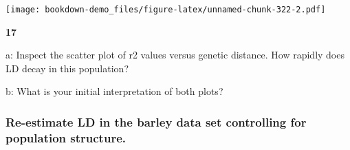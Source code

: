 \documentclass[
]{book}
\makeatletter
\newenvironment{kframe}{%
\medskip{}
\setlength{\fboxsep}{.8em}
 \def\at@end@of@kframe{}%
 \ifinner\ifhmode%
  \def\at@end@of@kframe{\end{minipage}}%
  \begin{minipage}{\columnwidth}%
 \fi\fi%
 \def\FrameCommand##1{\hskip\@totalleftmargin \hskip-\fboxsep
 \colorbox{shadecolor}{##1}\hskip-\fboxsep
     \hskip-\linewidth \hskip-\@totalleftmargin \hskip\columnwidth}%
 \MakeFramed {\advance\hsize-\width
   \@totalleftmargin\z@ \linewidth\hsize
   \@setminipage}}%
 {\par\unskip\endMakeFramed%
 \at@end@of@kframe}
\newenvironment{rmdblock}[1]
  {
  \begin{itemize}
  \renewcommand{\labelitemi}{
    \raisebox{-.7\height}[0pt][0pt]{
      {\setkeys{Gin}{width=3em,keepaspectratio}\texttt{[image: images/\#1]}}
    }
  }
  \setlength{\fboxsep}{1em}
  \begin{kframe}
  \item
  }
  {
  \end{kframe}
  \end{itemize}
  }
\newenvironment{rmdquiz}
  {\begin{rmdblock}{quiz}}
  {\end{rmdblock}}
\makeatother
\begin{document}
\texttt{[image: bookdown-demo\_files/figure-latex/unnamed-chunk-322-2.pdf]}

\begin{rmdquiz}
\textbf{17}

a: Inspect the scatter plot of r2 values versus genetic distance. How rapidly does LD decay in this population?

b: What is your initial interpretation of both plots?
\end{rmdquiz}

\hypertarget{re-estimate-ld-in-the-barley-data-set-controlling-for-population-structure.}{%
\subsubsection{Re-estimate LD in the barley data set controlling for population structure.}\label{re-estimate-ld-in-the-barley-data-set-controlling-for-population-structure.}}
\end{document}

